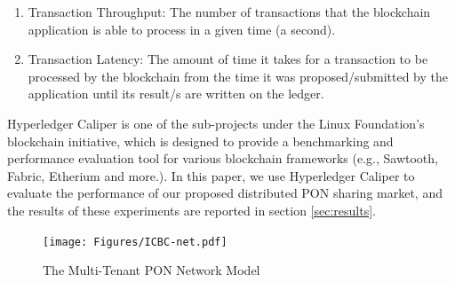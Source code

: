 \begin{enumerate}
    \item Transaction Throughput: The number of transactions that the blockchain application is able to process in a given time (a second).
    \item Transaction Latency: The amount of time it takes for a transaction to be processed by the blockchain from the time it was proposed/submitted by the application until its result/s are written on the ledger.
\end{enumerate}

Hyperledger Caliper \cite{caliper} is one of the sub-projects under the Linux Foundation's blockchain initiative, which is designed to provide a benchmarking and performance evaluation tool for various blockchain frameworks (e.g., Sawtooth, Fabric, Etherium and more.). In this paper, we use Hyperledger Caliper to evaluate the performance of our proposed distributed \ac{PON} sharing market, and the results of these experiments are reported in section \ref{sec:results}.

\begin{figure}[htbp]
  \centering
  \texttt{[image: Figures/ICBC-net.pdf]}
\caption{The Multi-Tenant \ac{PON} Network Model }
\label{Fig_bc}
\end{figure}

